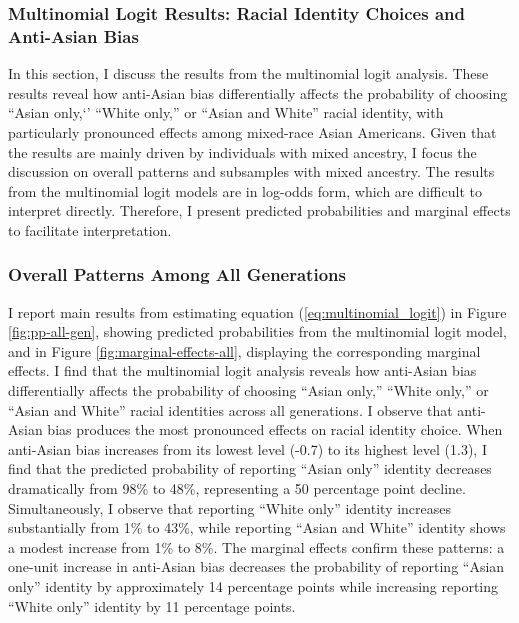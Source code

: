 \subsubsection*{Multinomial Logit Results: Racial Identity Choices and Anti-Asian Bias} \label{sec:multinomial}

In this section, I discuss the results from the multinomial logit analysis. These results reveal how anti-Asian bias differentially affects the probability of choosing ``Asian only,`' ``White only,'' or ``Asian and White'' racial identity, with particularly pronounced effects among mixed-race Asian Americans. Given that the results are mainly driven by individuals with mixed ancestry, I focus the discussion on overall patterns and subsamples with mixed ancestry. The results from the multinomial logit models are in log-odds form, which are difficult to interpret directly. Therefore, I present predicted probabilities and marginal effects to facilitate interpretation.

\subsubsection*{Overall Patterns Among All Generations}

I report main results from estimating equation (\ref{eq:multinomial_logit}) in Figure \ref{fig:pp-all-gen}, showing predicted probabilities from the multinomial logit model, and in Figure \ref{fig:marginal-effects-all}, displaying the corresponding marginal effects. I find that the multinomial logit analysis reveals how anti-Asian bias differentially affects the probability of choosing ``Asian only,'' ``White only,'' or ``Asian and White'' racial identities across all generations. I observe that anti-Asian bias produces the most pronounced effects on racial identity choice. When anti-Asian bias increases from its lowest level (-0.7) to its highest level (1.3), I find that the predicted probability of reporting ``Asian only'' identity decreases dramatically from 98\% to 48\%, representing a 50 percentage point decline. Simultaneously, I observe that reporting ``White only'' identity increases substantially from 1\% to 43\%, while reporting ``Asian and White'' identity shows a modest increase from 1\% to 8\%. The marginal effects confirm these patterns: a one-unit increase in anti-Asian bias decreases the probability of reporting ``Asian only'' identity by approximately 14 percentage points while increasing reporting ``White only'' identity by 11 percentage points.


